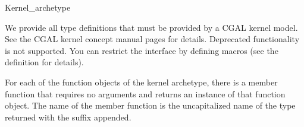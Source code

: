 \begin{ccRefClass}{Kernel_archetype}

\ccCreation
{}


\ccTypes

We provide all type definitions that must be provided by a CGAL kernel model.
See the CGAL kernel concept manual pages for details.
Deprecated functionality is not supported. You can restrict the interface
by defining macros (see the definition for details).

\ccOperations

For each of the function objects of the kernel archetype, there is a member function
that requires no arguments and returns an instance of that function object.
The name of the member function is the uncapitalized name of the type
returned with the suffix  appended.


\ccSeeAlso
{} \\
 \\
 \\

\end{ccRefClass}
